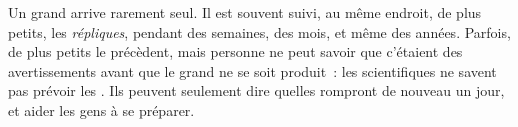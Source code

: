 Un grand  arrive rarement seul. Il est souvent suivi, au même
endroit, de  plus petits, les \emph{répliques}, pendant des
semaines, des mois, et même des années. Parfois, de plus petits  le
précèdent, mais personne ne peut savoir que c'étaient des avertissements
avant que le grand  ne se soit produit~: les scientifiques ne savent
pas prévoir les . Ils peuvent seulement dire quelles 
rompront de nouveau un jour, et aider les gens à se préparer.

